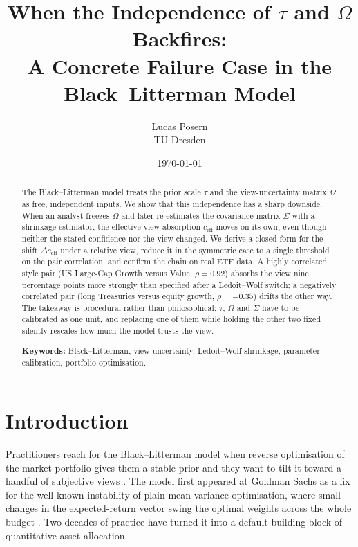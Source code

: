 \documentclass[a4paper,11pt]{article}
\theoremstyle{plain}
\theoremstyle{definition}
\newcommand{\eff}{\mathrm{eff}}
\begin{document}
\title{\bfseries When the Independence of $\tau$ and $\Omega$ Backfires:\\
       A Concrete Failure Case in the Black--Litterman Model}
\author{Lucas Posern\\[0.2em]
        \small TU Dresden}
\date{\today}
\maketitle

\begin{abstract}
\noindent
The Black--Litterman model treats the prior scale $\tau$ and the view-uncertainty
matrix $\Omega$ as free, independent inputs. We show that this independence has a
sharp downside. When an analyst freezes $\Omega$ and later re-estimates the
covariance matrix $\Sigma$ with a shrinkage estimator, the effective view
absorption $c_{\eff}$ moves on its own, even though neither the stated confidence
nor the view changed. We derive a closed form for the shift $\Delta c_{\eff}$
under a relative view, reduce it in the symmetric case to a single threshold on
the pair correlation, and confirm the chain on real ETF data. A highly
correlated style pair (US Large-Cap Growth versus Value, $\rho = 0.92$) absorbs
the view nine percentage points more strongly than specified after a Ledoit--Wolf
switch; a negatively correlated pair (long Treasuries versus equity growth,
$\rho = -0.35$) drifts the other way. The takeaway is procedural rather than
philosophical: $\tau$, $\Omega$ and $\Sigma$ have to be calibrated as one unit,
and replacing one of them while holding the other two fixed silently rescales
how much the model trusts the view.

\bigskip
\noindent\textbf{Keywords:} Black--Litterman, view uncertainty, Ledoit--Wolf
shrinkage, parameter calibration, portfolio optimisation.
\end{abstract}

\section{Introduction}
\label{sec:intro}

Practitioners reach for the Black--Litterman model when reverse optimisation of
the market portfolio gives them a stable prior and they want to tilt it toward a
handful of subjective views \citep{BlackLitterman1992}. The model first appeared
at Goldman Sachs as a fix for the well-known instability of plain mean-variance
optimisation, where small changes in the expected-return vector swing the
optimal weights across the whole budget \citep{HeLitterman1999}. Two decades of
practice have turned it into a default building block of quantitative asset
allocation.
\end{document}
